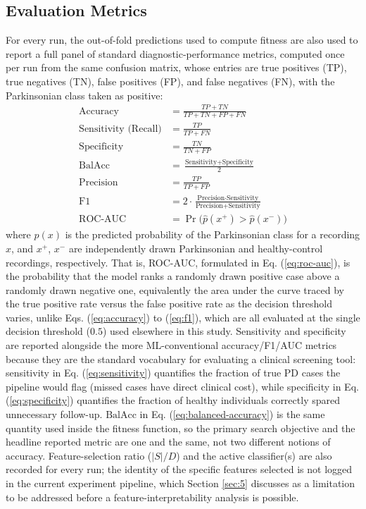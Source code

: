 \subsection{Evaluation Metrics} \label{sec:3.8}
For every run, the out-of-fold predictions used to compute fitness are also used to report a full panel of standard diagnostic-performance metrics, computed once per run from the same confusion matrix, whose entries are true positives (TP), true negatives (TN), false positives (FP), and false negatives (FN), with the Parkinsonian class taken as positive:
\begin{align}
  \text{Accuracy} &= \frac{TP + TN}{TP + TN + FP + FN} \label{eq:accuracy} \\
  \text{Sensitivity (Recall)} &= \frac{TP}{TP + FN} \label{eq:sensitivity} \\
  \text{Specificity} &= \frac{TN}{TN + FP} \label{eq:specificity} \\
  \text{BalAcc} &= \frac{\text{Sensitivity} + \text{Specificity}}{2} \label{eq:balanced-accuracy} \\
  \text{Precision} &= \frac{TP}{TP + FP} \label{eq:precision} \\
  \text{F1} &= 2 \cdot \frac{\text{Precision} \cdot \text{Sensitivity}}{\text{Precision} + \text{Sensitivity}} \label{eq:f1} \\
  \text{ROC-AUC} &= \Pr\big(\hat{p}(x^+) > \hat{p}(x^-)\big) \label{eq:roc-auc}
\end{align}
where $\hat{p}(x)$ is the predicted probability of the Parkinsonian class for a recording $x$, and $x^+$, $x^-$ are independently drawn Parkinsonian and healthy-control recordings, respectively. That is, ROC-AUC, formulated in Eq. (\ref{eq:roc-auc}), is the probability that the model ranks a randomly drawn positive case above a randomly drawn negative one, equivalently the area under the curve traced by the true positive rate versus the false positive rate as the decision threshold varies, unlike Eqs. (\ref{eq:accuracy}) to (\ref{eq:f1}), which are all evaluated at the single decision threshold ($0.5$) used elsewhere in this study. Sensitivity and specificity are reported alongside the more ML-conventional accuracy/F1/AUC metrics because they are the standard vocabulary for evaluating a clinical screening tool: sensitivity in Eq. (\ref{eq:sensitivity}) quantifies the fraction of true PD cases the pipeline would flag (missed cases have direct clinical cost), while specificity in Eq. (\ref{eq:specificity}) quantifies the fraction of healthy individuals correctly spared unnecessary follow-up. $\text{BalAcc}$ in Eq. (\ref{eq:balanced-accuracy}) is the same quantity used inside the fitness function, so the primary search objective and the headline reported metric are one and the same, not two different notions of accuracy. Feature-selection ratio ($|S|/D$) and the active classifier(s) are also recorded for every run; the identity of the specific features selected is not logged in the current experiment pipeline, which Section \ref{sec:5} discusses as a limitation to be addressed before a feature-interpretability analysis is possible.
